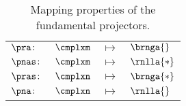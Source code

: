 \begin{table}[htdp]
\caption[Mapping properties of the fundamental projectors]{Mapping properties of the fundamental projectors.}
%
\begin{center}
\begin{tabular}{llcl}
%
  $\pra  \colon$ & $\cmplxm$ & $\longmapsto$ & $\brnga{}$ \\
  $\pnas \colon$ & $\cmplxm$ & $\longmapsto$ & $\rnlla{*}$ \\[10pt]
%
  $\pras \colon$ & $\cmplxn$ & $\longmapsto$ & $\brnga{*}$ \\
  $\pna  \colon$ & $\cmplxn$ & $\longmapsto$ & $\rnlla{}$ \\
%
\end{tabular}
\end{center}
\label{tab:projectors:mapping}
\end{table}

\endinput